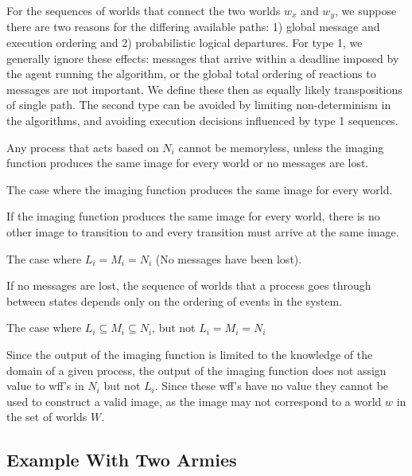 For the sequences of worlds that connect the two worlds $w_x$ and $w_y$, we suppose there are two reasons for the differing available paths: 1) global message and execution ordering and 2) probabilistic logical departures. For type 1, we generally ignore these effects: messages that arrive within a deadline imposed by the agent running the algorithm, or the global total ordering of reactions to messages are not important. We define these then as equally likely transpositions of single path. The second type can be avoided by limiting non-determinism in the algorithms, and avoiding execution decisions influenced by type 1 sequences.

\begin{thm}
Any process that acts based on $N_i$ cannot be memoryless, unless the imaging function produces the same image for every world or no messages are lost.
\end{thm}

\begin{case}
The case where the imaging function produces the same image for every world.
\end{case}

If the imaging function produces the same image for every world, there is no other image to transition to and every transition must arrive at the same image.

\begin{case}
The case where $L_i = M_i = N_i$ (No messages have been lost).
\end{case}

If no messages are lost, the sequence of worlds that a process goes through between states depends only on the ordering of events in the system. 

\begin{case}
The case where $L_i \subseteq M_i \subseteq N_i$, but not $L_i = M_i = N_i$
\end{case}

Since the output of the imaging function is limited to the knowledge of the domain of a given process, the output of the imaging function does not assign value to wff's in $N_i$ but not $L_i$. Since these wff's have no value they cannot be used to construct a valid image, as the image may not correspond to a world $w$ in the set of worlds $W$.

\subsection{Example With Two Armies}

